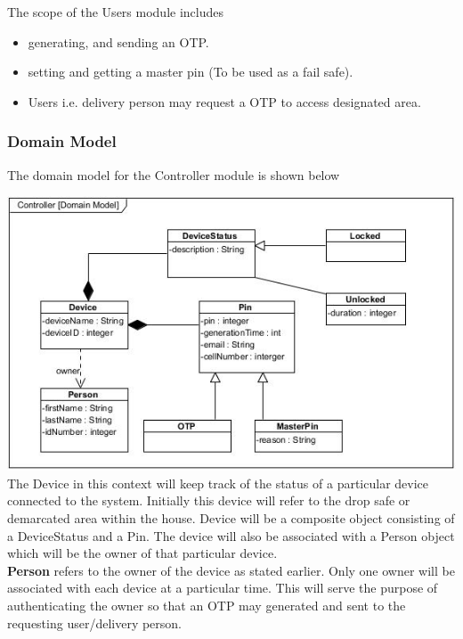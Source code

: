 \documentclass[a4paper,12pt]{article}
\begin{document}
	{\noindent}The scope of the Users module includes
	\begin{itemize}
		\item generating, and sending an OTP.
		\item setting and getting a master pin (To be used as a fail safe).
		\item Users i.e. delivery person may request a OTP to access designated area.
	\end{itemize}
	
	\newpage
	\subsubsection{Domain Model}
	The domain model for the Controller module is shown below
	
	\includegraphics[width=1\textwidth]{./Pictures/UML/controllerDomainModel.jpg}\\[1.5cm]	
	
	{\noindent}The Device in this context will keep track of the status of a particular device connected to the system. Initially this device will refer to the drop safe or demarcated area within the house. Device will be a composite object consisting of a DeviceStatus and a Pin. The device will also be associated with a Person object which will be the owner of that particular device.\\
	
	{\noindent}\textbf{Person} refers to the owner of the device as stated earlier. Only one owner will be associated with each device at a particular time. This will serve the purpose of authenticating the owner so that an OTP may generated and sent to the requesting user/delivery person.\\
	
\end{document}
